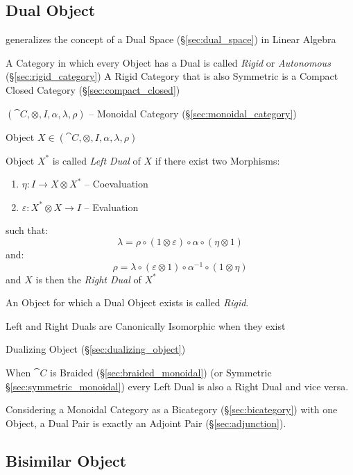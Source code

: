\subsection{Dual Object}\label{sec:dual_object}

generalizes the concept of a Dual Space (\S\ref{sec:dual_space}) in
Linear Algebra

A Category in which every Object has a Dual is called \emph{Rigid} or
\emph{Autonomous} (\S\ref{sec:rigid_category}) A Rigid Category that
is also Symmetric is a Compact Closed Category
(\S\ref{sec:compact_closed})

$(\cat{C}, \otimes, I, \alpha, \lambda, \rho)$ -- Monoidal Category
(\S\ref{sec:monoidal_category})

Object $X \in (\cat{C}, \otimes, I, \alpha, \lambda, \rho)$

Object $X^*$ is called \emph{Left Dual} of $X$ if there exist two
Morphisms:
\begin{enumerate}
  \item $\eta : I \rightarrow X \otimes X^*$ -- Coevaluation
  \item $\varepsilon : X^* \otimes X \rightarrow I$ -- Evaluation
\end{enumerate}
such that:
\[
  \lambda = \rho \circ (1 \otimes \varepsilon) \circ \alpha \circ
    (\eta \otimes 1)
\]
and:
\[
  \rho = \lambda \circ (\varepsilon \otimes 1) \circ \alpha^{-1}
    \circ (1 \otimes \eta)
\]
and $X$ is then the \emph{Right Dual} of $X^*$

An Object for which a Dual Object exists is called \emph{Rigid}.

Left and Right Duals are Canonically Isomorphic when they exist

Dualizing Object (\S\ref{sec:dualizing_object})

When $\cat{C}$ is Braided (\S\ref{sec:braided_monoidal}) (or Symmetric
\S\ref{sec:symmetric_monoidal}) every Left Dual is also a Right Dual
and vice versa.

Considering a Monoidal Category as a Bicategory
(\S\ref{sec:bicategory}) with one Object, a Dual Pair is exactly an
Adjoint Pair (\S\ref{sec:adjunction}).



\subsection{Bisimilar Object}\label{sec:bisimilar_object}


